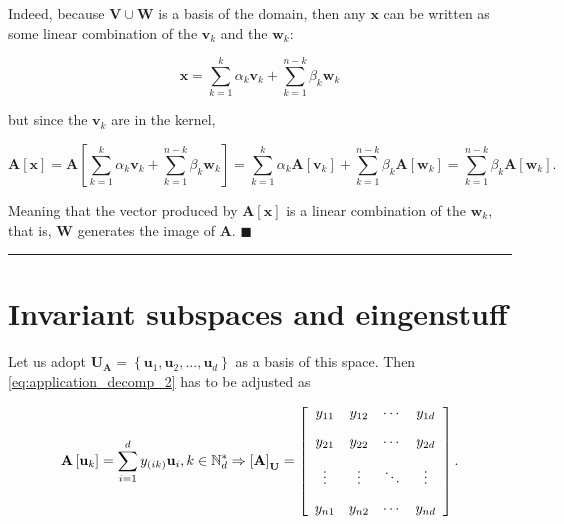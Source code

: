 	Indeed, because $\mathbf{V}\cup\mathbf{W}$ is a basis of the domain, then any $\mathbf{x}$ can be written as some linear combination of the $\mathbf{v}_k$ and the $\mathbf{w}_k$: 

\begin{equation} \mathbf{x} = \sum_{k=1}^k \alpha_k \mathbf{v}_k + \sum_{k=1}^{n-k} \beta_k \mathbf{w}_k\label{eq:theo_ranknull_1}\end{equation}

	\noindent but since the $\mathbf{v}_k$ are in the kernel,

\begin{equation} \mathbf{A}\left[\mathbf{x}\right] = \mathbf{A}\left[\sum_{k=1}^k \alpha_k \mathbf{v}_k + \sum_{k=1}^{n-k} \beta_k \mathbf{w}_k\right] = \sum_{k=1}^k \alpha_k \mathbf{A}\left[\mathbf{v}_k\right] + \sum_{k=1}^{n-k} \beta_k \mathbf{A}\left[\mathbf{w}_k\right] = \sum_{k=1}^{n-k} \beta_k \mathbf{A}\left[\mathbf{w}_k\right].\end{equation}

	Meaning that the vector produced by $\mathbf{A}\left[\mathbf{x}\right]$ is a linear combination of the $\mathbf{w}_k$, that is, $\mathbf{W}$ generates the image of $\mathbf{A}$.
\hfill$\blacksquare$
\vspace{5mm}
\hrule
\vspace{5mm} %

\section{Invariant subspaces and eingenstuff} %

	Let us adopt $\mathbf{U}_\mathbf{A} = \left\{\mathbf{u}_1,\mathbf{u}_2,...,\mathbf{u}_d\right\}$ as a basis of this space. Then \eqref{eq:application_decomp_2} has to be adjusted as

\begin{equation} \mathbf{A}\left[\mathbf{u}_k\right] = \sum\limits_{i=1}^d y_{\left(ik\right)} \mathbf{u}_i, k\in\mathbb{N}_d^* \Rightarrow \left[\raisebox{0mm}[1mm][1mm]{} \mathbf{A}\right]_\mathbf{U} = \left[\begin{array}{cccc} y_{11} & y_{12} & \cdots & y_{1d} \\[3mm] y_{21} & y_{22} & \cdots & y_{2d} \\[3mm] \vdots & \vdots & \ddots & \vdots \\[3mm] y_{n1} & y_{n2} & \cdots & y_{nd}\end{array}\right].\label{eq:application_decomp_4}\end{equation}

